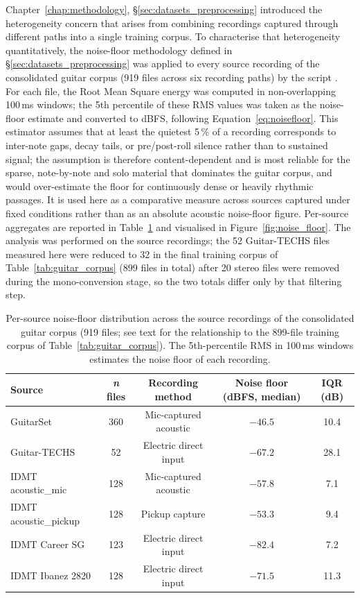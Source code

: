 \documentclass[a4paper,11pt,oneside,openany]{book}
\newcommand{\repobase}{https://github.com/jofregeli/voice-to-guitar-brave}
\newcommand{\repocommit}{36ddd4c7767be9e0b364fb0b6af7480256bd34bb}
\newcommand{\repofile}[1]{\href{\repobase/blob/\repocommit/\detokenize{#1}}{\texttt{\detokenize{#1}}}}
\begin{document}
Chapter~\ref{chap:methodology}, \S\ref{sec:datasets_preprocessing} introduced the heterogeneity concern that arises from combining recordings captured through different paths into a single training corpus. To characterise that heterogeneity quantitatively, the noise-floor methodology defined in \S\ref{sec:datasets_preprocessing} was applied to every source recording of the consolidated guitar corpus (919 files across six recording paths) by the script \repofile{scripts/analyze_noise_floor.py}. For each file, the Root Mean Square energy was computed in non-overlapping 100\,ms windows; the 5th percentile of these RMS values was taken as the noise-floor estimate and converted to dBFS, following Equation~\eqref{eq:noisefloor}. This estimator assumes that at least the quietest 5\,\% of a recording corresponds to inter-note gaps, decay tails, or pre/post-roll silence rather than to sustained signal; the assumption is therefore content-dependent and is most reliable for the sparse, note-by-note and solo material that dominates the guitar corpus, and would over-estimate the floor for continuously dense or heavily rhythmic passages. It is used here as a comparative measure across sources captured under fixed conditions rather than as an absolute acoustic noise-floor figure. Per-source aggregates are reported in Table~\ref{tab:noise_floor} and visualised in Figure~\ref{fig:noise_floor}. The analysis was performed on the source recordings; the 52 Guitar-TECHS files measured here were reduced to 32 in the final training corpus of Table~\ref{tab:guitar_corpus} (899 files in total) after 20 stereo files were removed during the mono-conversion stage, so the two totals differ only by that filtering step.

\begin{table}[H]
\centering
\caption{Per-source noise-floor distribution across the source recordings of the consolidated guitar corpus (919 files; see text for the relationship to the 899-file training corpus of Table~\ref{tab:guitar_corpus}). The 5th-percentile RMS in 100\,ms windows estimates the noise floor of each recording.}
\label{tab:noise_floor}
\begin{tabular}{lcccc}
\toprule
\textbf{Source} & \textbf{\textit{n} files} & \textbf{Recording method} & \textbf{Noise floor (dBFS, median)} & \textbf{IQR (dB)} \\
\midrule
GuitarSet & 360 & Mic-captured acoustic & $-46.5$ & 10.4 \\
Guitar-TECHS & 52 & Electric direct input & $-67.2$ & 28.1 \\
IDMT acoustic\_mic & 128 & Mic-captured acoustic & $-57.8$ & 7.1 \\
IDMT acoustic\_pickup & 128 & Pickup capture & $-53.3$ & 9.4 \\
IDMT Career SG & 123 & Electric direct input & $\mathbf{-82.4}$ & 7.2 \\
IDMT Ibanez 2820 & 128 & Electric direct input & $-71.5$ & 11.3 \\
\bottomrule
\end{tabular}
\end{table}
\end{document}
